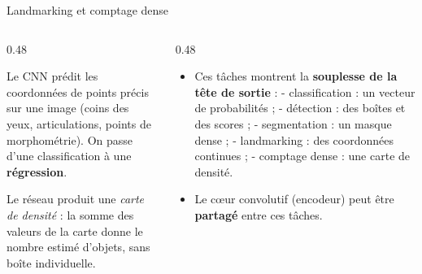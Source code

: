 \begin{frame}{Landmarking et comptage dense}
\begin{columns}[t]
\begin{column}{0.48\textwidth}
\begin{ebox}
Le CNN prédit les coordonnées de points précis sur une image
(coins des yeux, articulations, points de morphométrie). On passe d'une
classification à une \textbf{régression}.
\end{ebox}
\begin{kbox}
Le réseau produit une \emph{carte de densité} : la somme des valeurs de la
carte donne le nombre estimé d'objets, sans boîte individuelle.
\end{kbox}
\end{column}
\begin{column}{0.48\textwidth}
\begin{itemize}
  \item Ces tâches montrent la \textbf{souplesse de la tête de sortie} :
  - classification : un vecteur de probabilités ;
  - détection : des boîtes et des scores ;
  - segmentation : un masque dense ;
  - landmarking : des coordonnées continues ;
  - comptage dense : une carte de densité.
  \item Le cœur convolutif (encodeur) peut être \textbf{partagé} entre ces
  tâches.
\end{itemize}
\end{column}
\end{columns}
\end{frame}

